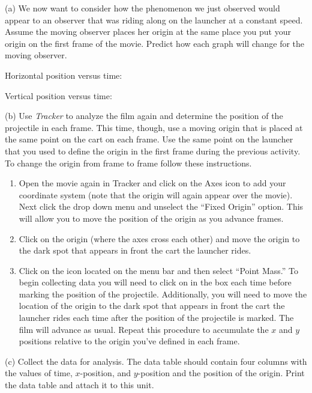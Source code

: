 (a) We now want to consider how the phenomenon we just observed would
appear to an observer that was riding along on the launcher at a constant
speed. Assume the moving observer places her origin at the same place
you put your origin on the first frame of the movie. Predict how each
graph will change for the moving observer.

Horizontal position versus time:
\vspace{10mm}

Vertical position versus time:
\vspace{10mm}

(b) Use \emph{Tracker} to analyze the film  again and determine the position of the projectile in each
frame. This time, though, use a moving origin that is placed
at the same point on the cart on each frame. Use the same point on
the launcher that you used to define the origin in the first frame
during the previous activity. To change the origin from frame to frame
follow these instructions.

\begin{enumerate}
\item Open the movie again in Tracker and click on the Axes icon to add your coordinate system (note that the origin will again appear over the movie).  Next click the  drop down menu and unselect the ``Fixed Origin'' option. This will allow you to move the position of the origin as you advance frames.

\item Click on the origin (where the axes cross each other) and move the origin to the dark spot that appears in front the cart the launcher rides.

\item Click on the  icon located on the menu bar and then select ``Point Mass.''  To begin collecting data you will need to click on  in the  box each time before marking the position of the projectile.  Additionally, you will need to move the location of the origin to the dark spot that appears in front the cart the launcher rides each time after the position of the projectile is marked.  The film will advance as usual. Repeat this procedure to accumulate
the $x$ and $y$ positions relative to the origin you've defined in each
frame.
\end{enumerate}
(c) Collect the data for analysis. The data table should contain four
columns with the values of time, $x$-position, and $y$-position and the
position of the origin. Print the data table and attach it to this unit.

